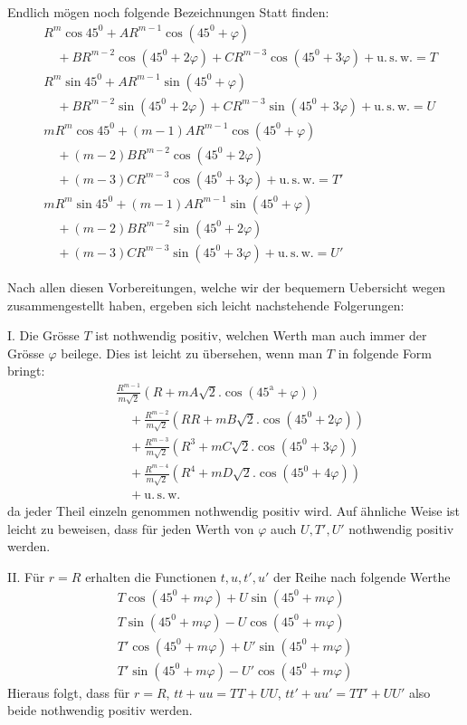 Endlich mögen noch folgende Bezeichnungen Statt finden:
\[
\begin{aligned}
&R^m\cos45^0+AR^{m-1}\cos(45^0+\varphi)
\\
&\quad+BR^{m-2}\cos(45^0+2\varphi)+CR^{m-3}\cos(45^0+3\varphi)
+\mathrm{u.\,s.\,w.}=T\\
&R^m\sin45^0+AR^{m-1}\sin(45^0+\varphi)
\\
&\quad+BR^{m-2}\sin(45^0+2\varphi)+CR^{m-3}\sin(45^0+3\varphi)
+\mathrm{u.\,s.\,w.}=U\\
&mR^m\cos45^0+(m-1)AR^{m-1}\cos(45^0+\varphi)
\\
&\quad+(m-2)BR^{m-2}\cos(45^0+2\varphi)
\\
&\quad+(m-3)CR^{m-3}\cos(45^0+3\varphi)+\mathrm{u.\,s.\,w.}=T'\\
&mR^m\sin45^0+(m-1)AR^{m-1}\sin(45^0+\varphi)
\\
&\quad+(m-2)BR^{m-2}\sin(45^0+2\varphi)
\\
&\quad+(m-3)CR^{m-3}\sin(45^0+3\varphi)+\mathrm{u.\,s.\,w.}=U'
\end{aligned}
\]

Nach allen diesen Vorbereitungen, welche wir der bequemern Uebersicht
wegen zusammengestellt haben, ergeben sich leicht nachstehende Folgerungen:

I. Die Grösse $T$ ist nothwendig positiv, welchen Werth man auch immer
der Grösse $\varphi$ beilege. Dies ist leicht zu übersehen, wenn man $T$
in folgende Form bringt:
\[
\begin{aligned}
&\frac{R^{m-1}}{m\surd2}(R+mA\surd2.\cos(45^{\mathrm{a}}+\varphi))\\
&\quad+\frac{R^{m-2}}{m\surd2}(RR+mB\surd2.\cos(45^0+2\varphi))\\
&\quad+\frac{R^{m-3}}{m\surd2}(R^3+mC\surd2.\cos(45^0+3\varphi))\\
&\quad+\frac{R^{m-4}}{m\surd2}(R^4+mD\surd2.\cos(45^0+4\varphi))\\
&\quad+\mathrm{u.\,s.\,w.}
\end{aligned}
\]
da jeder Theil einzeln genommen nothwendig positiv wird.
Auf ähnliche Weise ist leicht zu beweisen, dass für jeden Werth von
$\varphi$ auch $U,T',U'$ nothwendig positiv werden.

II. Für $r=R$ erhalten die Functionen $t,u,t',u'$ der Reihe nach
folgende Werthe
\[
\begin{gathered}
T\cos(45^0+m\varphi)+U\sin(45^0+m\varphi)\\
T\sin(45^0+m\varphi)-U\cos(45^0+m\varphi)\\
T'\cos(45^0+m\varphi)+U'\sin(45^0+m\varphi)\\
T'\sin(45^0+m\varphi)-U'\cos(45^0+m\varphi)
\end{gathered}
\]
Hieraus folgt, dass für $r=R$, $tt+uu=TT+UU$, $tt'+uu'=TT'+UU'$
also beide nothwendig positiv werden.


